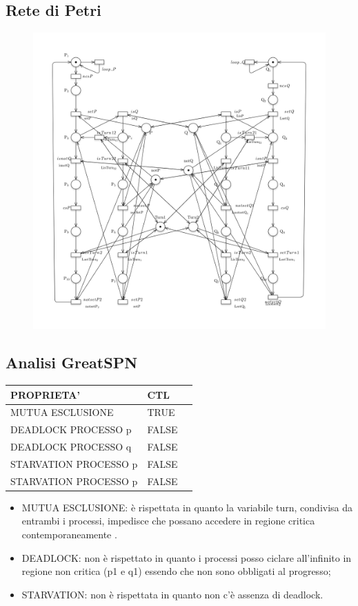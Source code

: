 \documentclass{article}
\begin{document}
\subsection{Rete di Petri}
\begin{figure}[h] 
\centering
\includegraphics[scale=0.29]{3.10PT.png}
\end{figure}
\subsection{Analisi GreatSPN}
\begin{tabular}{ |p{6cm}||p{3cm}|p{3cm}|}
 \hline
 PROPRIETA'& CTL\\
 \hline
 MUTUA ESCLUSIONE&TRUE \\
 DEADLOCK PROCESSO p&FALSE \\
 DEADLOCK PROCESSO q&FALSE\\
 STARVATION PROCESSO p&FALSE\\
 STARVATION PROCESSO p&FALSE\\
\hline
\end{tabular}
\begin{itemize}
    \item MUTUA ESCLUSIONE: è rispettata in quanto la variabile turn, condivisa da entrambi i processi, impedisce che possano accedere in regione critica contemporaneamente .
    \item DEADLOCK: non è rispettato in quanto i processi posso ciclare all'infinito in regione non critica (p1 e q1) essendo che non sono obbligati al progresso;
    \item STARVATION: non è rispettata in quanto non c'è assenza di deadlock.
\end{itemize}
\clearpage
\end{document}
